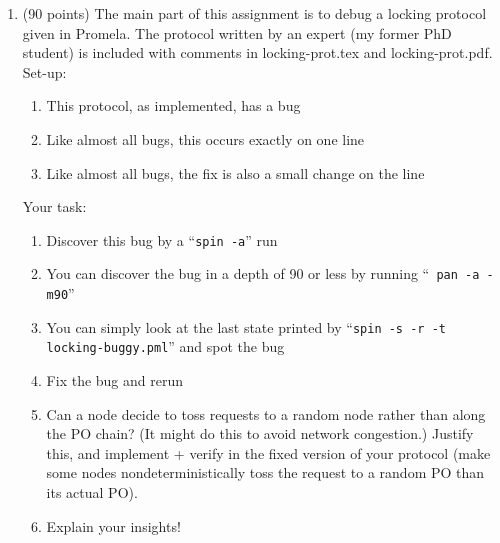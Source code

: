 \documentclass[11pt]{article}
\begin{document}
\begin{enumerate}
\item (90 points)
  The main part of this assignment is to debug a locking protocol given in
  Promela. The protocol written by an expert (my former PhD student) is included
  with comments in locking-prot.tex and locking-prot.pdf.
  Set-up:
  \begin{enumerate}
  \item This protocol, as implemented, has a bug
  \item Like almost all bugs, this occurs exactly on one line
  \item Like almost all bugs, the fix is also a small change on the line
  \end{enumerate}
  Your task:
  \begin{enumerate}
  \item Discover this bug by a ``{\tt spin -a}'' run
  \item You can discover the bug in a depth of 90 or less by running  ``{\tt
    pan -a -m90}'' 
  \item You can simply look at the last state printed by
    ``{\tt spin  -s -r -t locking-buggy.pml}'' and spot the bug
  \item Fix the bug and rerun
  \item Can a node decide to toss  requests to a random node rather than along the PO chain?
    (It might do this to avoid network congestion.) Justify this, and implement + verify in
    the fixed version of your protocol (make some nodes nondeterministically toss the
    request to a random PO than its actual PO).
  \item Explain your insights!
  \end{enumerate}  


\begin{minipage}{\minpagw}
\end{minipage}  
\end{enumerate}
\end{document}
